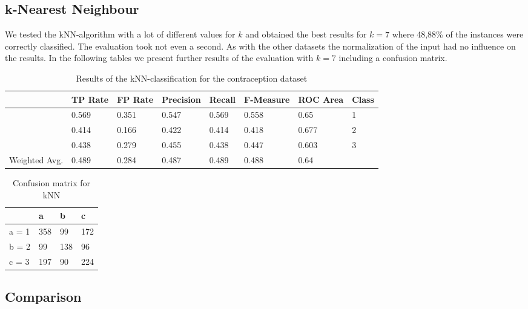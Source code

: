 \documentclass[paper=a4, fontsize=11pt]{scrartcl} %
\numberwithin{equation}{section} %
\numberwithin{figure}{section} %
\numberwithin{table}{section} %
\begin{document}
\subsection{k-Nearest Neighbour}

We tested the kNN-algorithm with a lot of different values for $k$ and obtained the best results for $k=7$ where 48,88\% of the instances were correctly classified. The evaluation took not even a second. As with the other datasets the normalization of the input had no influence on the results. In the following tables we present further results of the evaluation with $k=7$ including a confusion matrix.

\begin{table}[h]
\centering
\begin{tabular}{|llllllll|}
	\hline
	&								TP Rate   	&FP Rate   &Precision   &Recall  &F-Measure   &ROC Area  	&Class\\
	\hline
									&0.569     	&0.351     &0.547     	&0.569   &0.558      	&0.65     	&1\\
                 	&0.414     	&0.166     &0.422     	&0.414   &0.418      	&0.677    	&2\\
                 	&0.438     	&0.279     &0.455     	&0.438   &0.447      	&0.603    	&3\\
  \hline
	Weighted Avg.   &0.489     	&0.284     &0.487     	&0.489   &0.488      	&0.64			&\\
	\hline
\end{tabular}
\caption{Results of the kNN-classification for the contraception dataset}
\end{table}

\vspace{6pt}

\begin{table}[h]
\centering
\begin{tabular}{|l|lll|}
	\hline
	      &a   &b   &c \\
	\hline
    a = 1 &358 &99  &172\\
    b = 2 &99  &138 &96 \\
 	c = 3 &197 &90  &224 \\
  \hline
\end{tabular}
\caption{Confusion matrix for kNN}
\end{table}

\subsection{Comparison}



\end{document}
